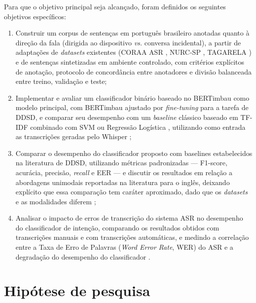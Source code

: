 \documentclass[
    12pt,                %
    openright,           %
    oneside,             %
    a4paper,             %
    english,             %
    brazil               %
]{abntex2}
\begin{document}
Para que o objetivo principal seja alcançado, foram definidos os seguintes objetivos específicos:

\begin{enumerate}
    \item Construir um corpus de sentenças em português brasileiro anotadas quanto à
    direção da fala (dirigida ao dispositivo \textit{vs.} conversa incidental), a partir
    de adaptações de \textit{datasets} existentes (CORAA ASR \cite{CORAA2023},
    NURC-SP \cite{NURCSP2025}, TAGARELA \cite{Tagarela2026}) e de sentenças
    sintetizadas em ambiente controlado, com critérios explícitos de anotação, protocolo
    de concordância entre anotadores e divisão balanceada entre treino, validação e
    teste;

    \item Implementar e avaliar um classificador binário baseado no BERTimbau
    \cite{Souza2020} como modelo principal, com BERTimbau ajustado por
    \textit{fine-tuning} para a tarefa de DDSD, e comparar seu desempenho com um
    \textit{baseline} clássico baseado em TF-IDF combinado com SVM ou Regressão
    Logística \cite{Manning2008}, utilizando como entrada as transcrições geradas pelo
    Whisper \cite{Radford2023};

    \item Comparar o desempenho do classificador proposto com baselines estabelecidos na
    literatura de DDSD, utilizando métricas padronizadas — F1-score, acurácia, precisão,
    \textit{recall} e EER — e discutir os resultados em relação a abordagens unimodais
    reportadas na literatura para o inglês, deixando explícito que essa comparação tem
    caráter aproximado, dado que os \textit{datasets} e as modalidades diferem
    \cite{Wagner2024};

    \item Analisar o impacto de erros de transcrição do sistema ASR no desempenho do
    classificador de intenção, comparando os resultados obtidos com transcrições manuais
    e com transcrições automáticas, e medindo a correlação entre a Taxa de Erro de Palavras
    (\textit{Word Error Rate}, WER) do ASR e a degradação do desempenho do classificador
    \cite{Dighe2024}.
\end{enumerate}

\section{Hipótese de pesquisa}
\end{document}
